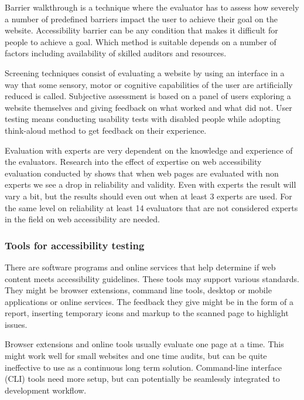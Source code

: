 \documentclass{master_thesis}
\begin{document}
Barrier walkthrough is a technique where the evaluator has to assess how severely a number of predefined barriers impact the user to achieve their goal on the website. Accessibility barrier can be any condition that makes it difficult for people to achieve a goal. Which method is suitable depends on a number of factors including availability of skilled auditors and resources. \citep{Brajnik2008}

Screening techniques consist of evaluating a website by using an interface in a way that some sensory, motor or cognitive capabilities of the user are artificially reduced is called. Subjective assessment is based on a panel of users exploring a website themselves and giving feedback on what worked and what did not. User testing means conducting usability tests with disabled people while adopting think-aloud method to get feedback on their experience. \citep{Brajnik2008}

Evaluation with experts are very dependent on the knowledge and experience of the evaluators. Research into the effect of expertise on web accessibility evaluation conducted by \citeauthor{Brajnik2011} shows that when web pages are evaluated with non experts we see a drop in reliability and validity. Even with experts the result will vary a bit, but the results should even out when at least 3 experts are used. For the same level on reliability at least 14 evaluators that are not considered experts in the field on web accessibility are needed. \citep{Brajnik2011}

\subsubsection{Tools for accessibility testing}

There are software programs and online services that help determine if web content meets accessibility guidelines. These tools may support various standards. They might be browser extensions, command line tools, desktop or mobile applications or online services. The feedback they give might be in the form of a report, inserting temporary icons and markup to the scanned page to highlight issues. \citep{AbouZahra2017}

Browser extensions and online tools usually evaluate one page at a time. This might work well for small websites and one time audits, but can be quite ineffective to use as a continuous long term solution. Command-line interface (CLI) tools need more setup, but can potentially be seamlessly integrated to development workflow.
\end{document}
